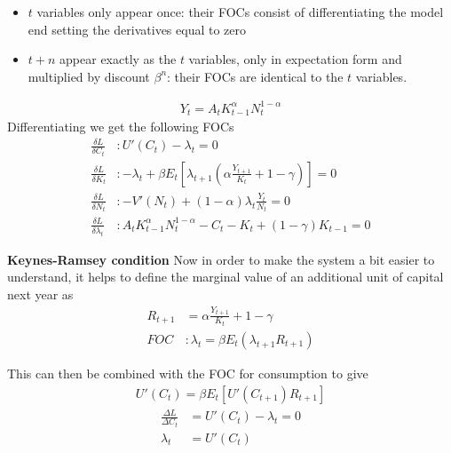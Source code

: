 \documentclass{beamer}
\begin{document}
\begin{frame}
  \begin{itemize}
  \item $t$ variables only appear once: their FOCs consist of differentiating the model end setting the derivatives equal to zero
  \item $t+n$ appear exactly as the $t$ variables, only in expectation form and multiplied by discount $\beta^n$: their FOCs are identical to the $t$ variables. 
\end{itemize}
\end{frame}

\begin{frame}
\begin{align}
  Y_t = A_tK^\alpha_{t-1}N^{1-\alpha}_t 
  \end{align}
  Differentiating we get the following FOCs
\begin{align}
  \frac{\delta L}{\delta C_t}&: U'(C_t)-\lambda_t=0\\
  \frac{\delta L}{\delta K_t}&: -\lambda_t + \beta E_t\left[\lambda_{t+1} \left( \alpha\frac{Y_{t+1}}{K_t}+1-\gamma \right) \right] =0\\
  \frac{\delta L}{\delta N_t}&: -V'(N_t) + (1-\alpha) \lambda_t \frac{Y_t}{N_t}=0\\
  \frac{\delta L}{\delta \lambda_t}&: A_tK^\alpha_{t-1}N^{1-\alpha}_t - C_t - K_t + (1-\gamma)K_{t-1} =0
\end{align}
\end{frame}

\begin{frame}
 \textbf{Keynes-Ramsey condition}
 Now in order to make the system a bit easier to understand, it helps to define the marginal value of an additional unit of capital next year as
\begin{align}
  R_{t+1}&= \alpha \frac{Y_{t+1}}{K_t}+1-\gamma\\
  FOC &: \lambda_t=\beta E_t(\lambda_{t+1}R_{t+1})  
\end{align}

This can then be combined with the FOC for consumption to give
\begin{align}
  U'(C_t)= \beta E_t[U'(C_{t+1})R_{t+1}]
\end{align}
\begin{align}
  \frac{\Delta L}{\Delta C_t} &= U'(C_t)-\lambda_t=0\\
  \lambda_t &= U'(C_t)
\end{align}
\end{frame}
\end{document}
